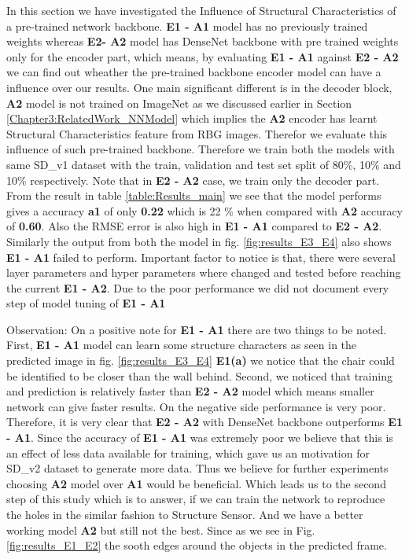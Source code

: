 \label{Chapter6:Influence_Structural_Char}
In this section we have investigated the Influence of Structural Characteristics of a pre-trained network backbone. \textbf{E1 - A1} model has no previously trained weights whereas \textbf{E2- A2} model has DenseNet backbone with pre trained weights only for the encoder part, which means, by evaluating \textbf{E1 - A1} against \textbf{E2 - A2} we can find out wheather the pre-trained backbone encoder model can have a influence over our results. One main significant different is in the decoder block, \textbf{A2} model is not trained on ImageNet as we discussed earlier in Section \ref{Chapter3:RelatedWork_NNModel} which implies the \textbf{A2} encoder has learnt Structural Characteristics feature from RBG images. Therefor we evaluate this influence of such pre-trained backbone. Therefore we train both the models with same SD\_v1 dataset with the train, validation and test set split of 80\%, 10\%  and 10\% respectively. Note that in \textbf{E2 - A2} case, we train only the decoder part. From the result in table \ref{table:Results_main} we see that the model performs gives a accuracy \textbf{a1} of only \textbf{0.22} which is 22 \% when compared with \textbf{A2} accuracy of \textbf{0.60}. Also the RMSE error is also high in \textbf{E1 - A1} compared to \textbf{E2 - A2}. Similarly the output from both the model in fig. \ref{fig:results_E3_E4} also shows  \textbf{E1 - A1} failed to perform. Important factor to notice is that, there were several layer parameters and hyper parameters where changed and tested before reaching the current \textbf{E1 - A2}. Due to the poor performance we did not document every step of model tuning of \textbf{E1 - A1} 

Observation: On a positive note for \textbf{E1 - A1} there are two things to be noted. First,  \textbf{E1 - A1} model can learn some structure characters as seen in the predicted image in fig. \ref{fig:results_E3_E4} \textbf{E1(a)} we notice that the chair could be identified to be closer than the wall behind. Second, we noticed that training and prediction is relatively  faster than \textbf{E2 - A2} model which means smaller network can give faster results. On the negative  side performance is very poor. 
Therefore, it is very clear that \textbf{E2 - A2} with DenseNet backbone outperforms \textbf{E1 - A1}. Since the accuracy of \textbf{E1 - A1} was extremely poor we believe that this is an effect of less data available for training, which gave us an motivation for SD\_v2  dataset to generate more data. Thus we believe for further experiments choosing \textbf{A2} model over \textbf{A1} would be beneficial. Which leads us to the second step of this study which is to answer, if we can train the network to reproduce the holes in the similar fashion to Structure Sensor. And we have a better working model \textbf{A2} but still not the best. Since as we see in Fig. \ref{fig:results_E1_E2} the sooth edges around the objects in the predicted frame. 
 


